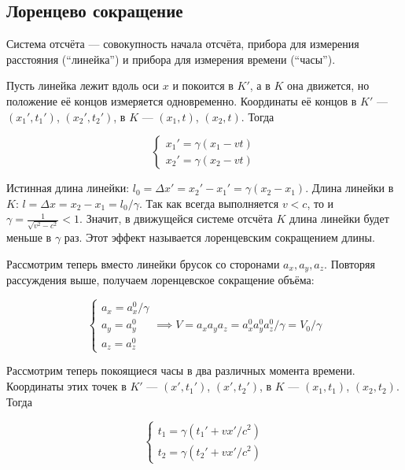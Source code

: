 \documentclass{article}
\begin{document}
\subsection{Лоренцево сокращение}

Система отсчёта --- совокупность начала отсчёта, прибора для измерения расстояния (``линейка'') и прибора для измерения времени (``часы'').

Пусть линейка лежит вдоль оси $x$ и покоится в $K'$, а в $K$ она движется, но положение её концов измеряется одновременно. Координаты её концов в $K'$ --- $\left(x_1', t_1'\right)$, $\left(x_2', t_2'\right)$, в $K$ --- $\left(x_1, t\right)$, $\left(x_2, t\right)$. Тогда

\begin{equation*}
    \begin{cases}
    x_1'=\gamma\left(x_1-vt\right)\\
    x_2'=\gamma\left(x_2-vt\right)
    \end{cases}
\end{equation*}

Истинная длина линейки: $l_0=\Delta x'=x_2'-x_1'=\gamma\left(x_2-x_1\right)$. Длина линейки в $K$: $l=\Delta x=x_2-x_1=l_0/\gamma$. Так как всегда выполняется $v <c$, то и $\gamma=\frac{1}{\sqrt{v^2-c^2}} < 1$. Значит, в движущейся системе отсчёта $K$ длина линейки будет меньше в $\gamma$ раз. Этот эффект называется лоренцевским сокращением длины.

Рассмотрим теперь вместо линейки брусок со сторонами $a_x, a_y, a_z$. Повторяя рассуждения выше, получаем лоренцевское сокращение объёма:

\begin{equation*}
    \begin{cases}
    a_x=a_x^0/\gamma\\
    a_y=a_y^0\\
    a_z=a_z^0
    \end{cases}
    \implies V=a_xa_ya_z = a_x^0a_y^0a_z^0/\gamma=V_0/\gamma
\end{equation*}

Рассмотрим теперь покоящиеся часы в два различных момента времени. Координаты этих точек в $K'$ --- $\left(x', t_1'\right)$, $\left(x', t_2'\right)$, в $K$ --- $\left(x_1, t_1\right)$, $\left(x_2, t_2\right)$. Тогда

\begin{equation*}
    \begin{cases}
    t_1=\gamma\left(t_1'+vx'/c^2\right)\\
    t_2=\gamma\left(t_2'+vx'/c^2\right)
    \end{cases}
\end{equation*}
\end{document}
